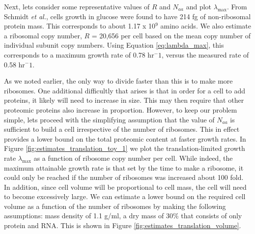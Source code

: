 \documentclass[11pt, letterpaper]{article}
\begin{document}
%
%
%
%
%


Next, lets consider some representative values of $R$ and $N_{aa}$ and plot
$\lambda_{\text{max}}$. From Schmidt {\it et al.}, cells growth in glucose were
found to have 214 fg of non-ribosomal  protein mass. This corresponds to about
1.17 x 10$^9$ amino acids. We also estimate a  ribosomal copy number, $R$ =
20,656 per cell based on the mean copy number of individual subunit copy
numbers. Using Equation \ref{eq:lambda_max}, this corresponds to a maximum
growth rate of 0.78 hr$^-1$, versus the measured rate of 0.58 hr$^-1$.

As we noted earlier, the only way to divide faster than this is to make more
ribosomes. One additional difficultly that arises is that in order for a cell to
add proteins, it likely will need to increase in size. This may then require
that other proteomic proteins also increase in proportion. However, to keep our
problem simple, lets proceed with the simplifying assumption that the value of
$N_{aa}$ is sufficient to build a cell irrespective of the number of ribosomes.
This in effect provides a lower bound on the total proteomic content at faster
growth rates. In Figure \ref{fig:estimates_translation_toy_1} we plot the translation-limited growth rate
$\lambda_{\text{max}}$ as a function of ribosome copy number per cell. While indeed,
the maximum attainable growth rate is that set by the time to make a ribosome,
it could only be reached if the number of ribosomes was increased about 100 fold.
In addition, since cell volume will be proportional to cell mass, the cell will need
to become excessively large. We can estimate a lower bound on the required cell
volume as a function of the number of ribosomes by making the following assumptions:  mass density of 1.1
g/ml, a dry mass of 30\% that consists of only protein and RNA.  This is shown
in Figure \ref{fig:estimates_translation_volume}.
\end{document}
